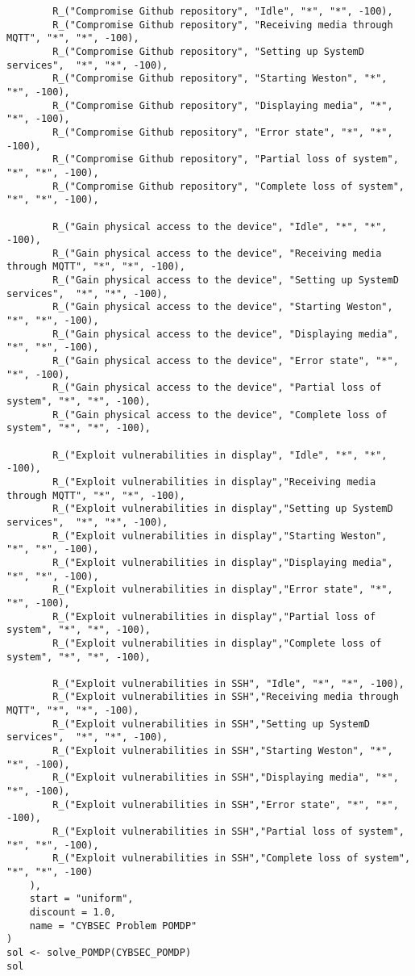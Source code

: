 \documentclass[language=english,version=final,mainfont=none,sharelatex=false]{utuftthesis}
\begin{document}
\begin{verbatim}
        R_("Compromise Github repository", "Idle", "*", "*", -100),
        R_("Compromise Github repository", "Receiving media through MQTT", "*", "*", -100),
        R_("Compromise Github repository", "Setting up SystemD services",  "*", "*", -100),
        R_("Compromise Github repository", "Starting Weston", "*", "*", -100),
        R_("Compromise Github repository", "Displaying media", "*", "*", -100),
        R_("Compromise Github repository", "Error state", "*", "*", -100),
        R_("Compromise Github repository", "Partial loss of system", "*", "*", -100),
        R_("Compromise Github repository", "Complete loss of system", "*", "*", -100),

        R_("Gain physical access to the device", "Idle", "*", "*", -100),
        R_("Gain physical access to the device", "Receiving media through MQTT", "*", "*", -100),
        R_("Gain physical access to the device", "Setting up SystemD services",  "*", "*", -100),
        R_("Gain physical access to the device", "Starting Weston", "*", "*", -100),
        R_("Gain physical access to the device", "Displaying media", "*", "*", -100),
        R_("Gain physical access to the device", "Error state", "*", "*", -100),
        R_("Gain physical access to the device", "Partial loss of system", "*", "*", -100),
        R_("Gain physical access to the device", "Complete loss of system", "*", "*", -100),

        R_("Exploit vulnerabilities in display", "Idle", "*", "*", -100),
        R_("Exploit vulnerabilities in display","Receiving media through MQTT", "*", "*", -100),
        R_("Exploit vulnerabilities in display","Setting up SystemD services",  "*", "*", -100),
        R_("Exploit vulnerabilities in display","Starting Weston", "*", "*", -100),
        R_("Exploit vulnerabilities in display","Displaying media", "*", "*", -100),
        R_("Exploit vulnerabilities in display","Error state", "*", "*", -100),
        R_("Exploit vulnerabilities in display","Partial loss of system", "*", "*", -100),
        R_("Exploit vulnerabilities in display","Complete loss of system", "*", "*", -100),

        R_("Exploit vulnerabilities in SSH", "Idle", "*", "*", -100),
        R_("Exploit vulnerabilities in SSH","Receiving media through MQTT", "*", "*", -100),
        R_("Exploit vulnerabilities in SSH","Setting up SystemD services",  "*", "*", -100),
        R_("Exploit vulnerabilities in SSH","Starting Weston", "*", "*", -100),
        R_("Exploit vulnerabilities in SSH","Displaying media", "*", "*", -100),
        R_("Exploit vulnerabilities in SSH","Error state", "*", "*", -100),
        R_("Exploit vulnerabilities in SSH","Partial loss of system", "*", "*", -100),
        R_("Exploit vulnerabilities in SSH","Complete loss of system", "*", "*", -100)
    ),
    start = "uniform",
    discount = 1.0,
    name = "CYBSEC Problem POMDP"
)
sol <- solve_POMDP(CYBSEC_POMDP)
sol
\end{verbatim}
\end{document}
